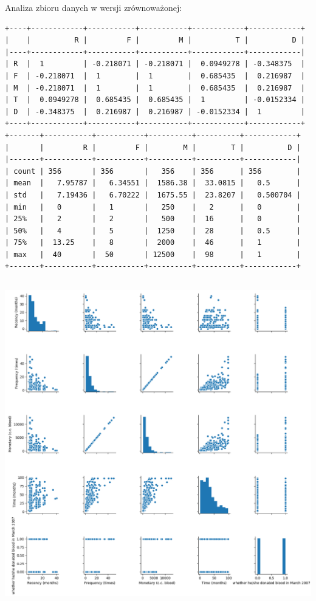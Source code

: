 \documentclass[11pt, a4paper, notitlepage]{report}
\begin{document}
Analiza zbioru danych w wersji zrównoważonej:

\begin{verbatim}
+----+------------+-----------+-----------+------------+------------+
|    |          R |         F |         M |          T |          D |
|----+------------+-----------+-----------+------------+------------|
| R  |  1         | -0.218071 | -0.218071 |  0.0949278 | -0.348375  |
| F  | -0.218071  |  1        |  1        |  0.685435  |  0.216987  |
| M  | -0.218071  |  1        |  1        |  0.685435  |  0.216987  |
| T  |  0.0949278 |  0.685435 |  0.685435 |  1         | -0.0152334 |
| D  | -0.348375  |  0.216987 |  0.216987 | -0.0152334 |  1         |
+----+------------+-----------+-----------+------------+------------+
+-------+-----------+-----------+----------+----------+------------+
|       |         R |         F |        M |        T |          D |
|-------+-----------+-----------+----------+----------+------------|
| count | 356       | 356       |   356    | 356      | 356        |
| mean  |   7.95787 |   6.34551 |  1586.38 |  33.0815 |   0.5      |
| std   |   7.19436 |   6.70222 |  1675.55 |  23.8207 |   0.500704 |
| min   |   0       |   1       |   250    |   2      |   0        |
| 25%   |   2       |   2       |   500    |  16      |   0        |
| 50%   |   4       |   5       |  1250    |  28      |   0.5      |
| 75%   |  13.25    |   8       |  2000    |  46      |   1        |
| max   |  40       |  50       | 12500    |  98      |   1        |
+-------+-----------+-----------+----------+----------+------------+
\end{verbatim}

\includegraphics[width=400pt,height=400pt]{graphics/correlation_2} \\ 
\end{document}

